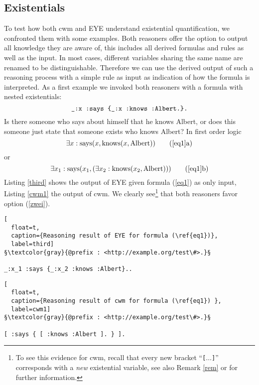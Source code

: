 \subsection{Existentials}
To test how both cwm and EYE understand existential quantification, we confronted them with some examples.
Both reasoners offer the option to output all knowledge they are aware of, this includes all derived formulas and rules as well as the
input. In most cases, different variables sharing the same name are renamed to be distinguishable. %
Therefore we can use the derived output of such a reasoning process with a simple rule as input as indication of
how the formula is interpreted. As a first example %
we invoked both reasoners with
a formula with nested existentials:
\begin{equation}\label{eq1}
\verb!_:x :says {_:x :knows :Albert.}.!
 \end{equation}
Is there someone who says about himself that he knows Albert, or does this someone just state that someone exists who knows Albert?
In first order logic
\[\exists x : \text{says}(x, \text{knows}(x, \text{Albert})) \tag{\ref{eq1}a}\]
\hspace{6cm} or
\[\exists x_1 : \text{says}(x_1, (\exists x_2: \text{knows}(x_2, \text{Albert})))\tag{\ref{eq1}b} \label{zwei}\]
%
Listing \ref{third} shows the output of EYE given formula (\ref{eq1}) as only input, Listing \ref{cwm1} the output of cwm. 
We clearly see\footnote{To see this evidence 
for cwm, recall that every new bracket ``\texttt{[}$\ldots$\texttt{]}'' corresponds with a \emph{new} existential variable, see also Remark \ref{rem} or \cite{turtle} for further information. }
that both reasoners favor 
option (\ref{zwei}).  
\begin{lstlisting}[
  float=t,
  caption={Reasoning result of EYE for formula (\ref{eq1})},
  label=third]
§\textcolor{gray}{@prefix : <http://example.org/test\#>.}§

_:x_1 :says {_:x_2 :knows :Albert}..

\end{lstlisting}

\begin{lstlisting}[
  float=t,
  caption={Reasoning result of cwm for formula (\ref{eq1}) },
  label=cwm1]
§\textcolor{gray}{@prefix : <http://example.org/test\#>.}§

[ :says { [ :knows :Albert ]. } ].
\end{lstlisting}

